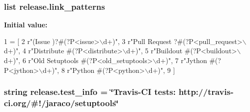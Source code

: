 \subsubsection[{link\+\_\+patterns}]{\setlength{\rightskip}{0pt plus 5cm}list release.\+link\+\_\+patterns}\label{namespacerelease_a10e23691424654f839adbf69d9d69b4c}
{\bfseries Initial value\+:}
\begin{DoxyCode}
1 = [
2     \textcolor{stringliteral}{r"(Issue )?#(?P<issue>\(\backslash\)d+)"},
3     \textcolor{stringliteral}{r"Pull Request ?#(?P<pull\_request>\(\backslash\)d+)"},
4     \textcolor{stringliteral}{r"Distribute #(?P<distribute>\(\backslash\)d+)"},
5     \textcolor{stringliteral}{r"Buildout #(?P<buildout>\(\backslash\)d+)"},
6     \textcolor{stringliteral}{r"Old Setuptools #(?P<old\_setuptools>\(\backslash\)d+)"},
7     \textcolor{stringliteral}{r"Jython #(?P<jython>\(\backslash\)d+)"},
8     \textcolor{stringliteral}{r"Python #(?P<python>\(\backslash\)d+)"},
9 ]
\end{DoxyCode}
\hypertarget{namespacerelease_ab36a1058381a20624c07d89430a50083}{}
\subsubsection[{test\+\_\+info}]{\setlength{\rightskip}{0pt plus 5cm}string release.\+test\+\_\+info = \char`\"{}Travis-\/C\+I tests\+: http\+://travis-\/ci.\+org/\#!/jaraco/setuptools\char`\"{}}\label{namespacerelease_ab36a1058381a20624c07d89430a50083}

